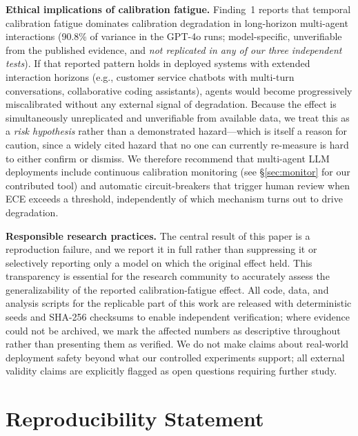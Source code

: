 \documentclass[11pt]{article}
\theoremstyle{definition}
\theoremstyle{remark}
\begin{document}
\textbf{Ethical implications of calibration fatigue.} Finding~1 reports that temporal calibration fatigue dominates calibration degradation in long-horizon multi-agent interactions (90.8\% of variance in the GPT-4o runs; model-specific, unverifiable from the published evidence, and \emph{not replicated in any of our three independent tests}). If that reported pattern holds in deployed systems with extended interaction horizons (e.g., customer service chatbots with multi-turn conversations, collaborative coding assistants), agents would become progressively miscalibrated without any external signal of degradation. Because the effect is simultaneously unreplicated and unverifiable from available data, we treat this as a \emph{risk hypothesis} rather than a demonstrated hazard---which is itself a reason for caution, since a widely cited hazard that no one can currently re-measure is hard to either confirm or dismiss. We therefore recommend that multi-agent LLM deployments include continuous calibration monitoring (see \S\ref{sec:monitor} for our contributed tool) and automatic circuit-breakers that trigger human review when ECE exceeds a threshold, independently of which mechanism turns out to drive degradation.

\textbf{Responsible research practices.} The central result of this paper is a reproduction failure, and we report it in full rather than suppressing it or selectively reporting only a model on which the original effect held. This transparency is essential for the research community to accurately assess the generalizability of the reported calibration-fatigue effect. All code, data, and analysis scripts for the replicable part of this work are released with deterministic seeds and SHA-256 checksums to enable independent verification; where evidence could not be archived, we mark the affected numbers as descriptive throughout rather than presenting them as verified. We do not make claims about real-world deployment safety beyond what our controlled experiments support; all external validity claims are explicitly flagged as open questions requiring further study.

\section*{Reproducibility Statement}
\end{document}
